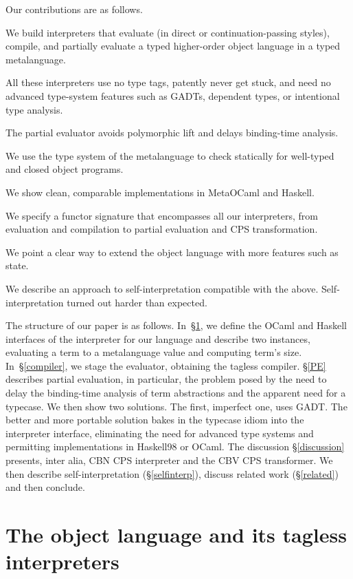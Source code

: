 \documentclass[preprint]{sigplanconf}
\begin{document}
Our contributions are as follows.
\begin{enumerate*}
\item We build interpreters that evaluate (in direct or continuation\hyp passing styles),
  compile, and partially evaluate a typed higher-order object language
   in a typed metalanguage.
\item All these interpreters use no type tags, patently never get stuck,
    and need no advanced type-system features such as GADTs, dependent types,
    or intentional type analysis.
\item The partial evaluator avoids polymorphic lift and delays binding-time
    analysis.
\item We use the type system of the metalanguage
    to check statically for well-typed and closed object programs.
\item We show clean, comparable implementations in MetaOCaml and Haskell.
\item We specify a functor signature that encompasses all our interpreters, from
    evaluation and compilation to partial evaluation and CPS transformation.
\item We point a clear way to extend the object language with more features
  such as state.
\item We describe an approach to self\hyp interpretation compatible with the
  above.  Self\hyp interpretation turned out harder than expected.
\end{enumerate*}


The structure of our paper is as follows. In~\S\ref{language}, we
define the OCaml and Haskell interfaces of the interpreter for our
language and describe two instances, evaluating a term to a
metalanguage value and computing term's size.
In~\S\ref{compiler}, we stage the evaluator, obtaining the tagless
compiler. \S\ref{PE} describes partial evaluation, in
particular, the problem posed by the need to delay the 
binding-time analysis of term abstractions and the apparent 
need for a typecase. We then show two solutions. The first, imperfect
one, uses GADT. The better and more portable solution bakes in the
typecase idiom into the interpreter interface, eliminating the need for
advanced type systems and permitting implementations in Haskell98 or OCaml.
The discussion \S\ref{discussion} presents, inter alia, CBN CPS
interpreter and the CBV CPS transformer. We then describe 
self-interpretation (\S\ref{selfinterp}),
discuss related work (\S\ref{related}) and then conclude.

\section{The object language and its tagless interpreters}\label{language}
\end{document}
